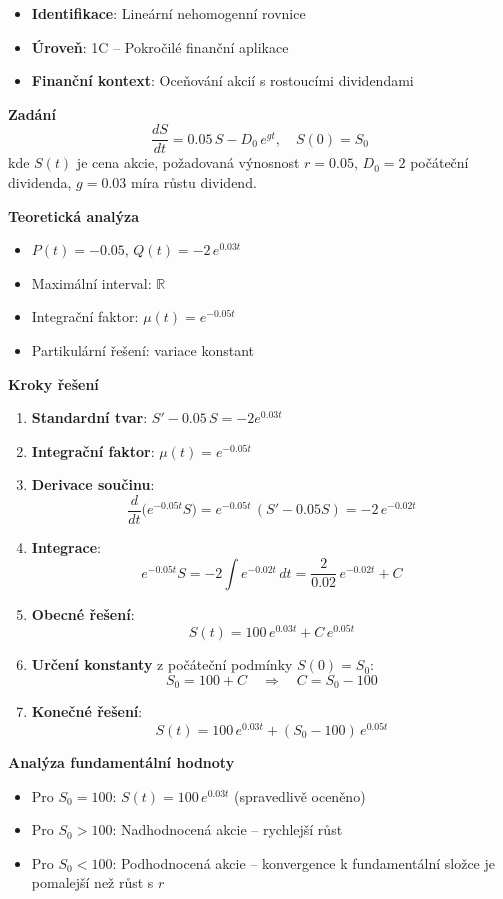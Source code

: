 \begin{example}
\label{ex:gordon-growth}

\begin{itemize}
\item \textbf{Identifikace}: Lineární nehomogenní rovnice
\item \textbf{Úroveň}: 1C -- Pokročilé finanční aplikace
\item \textbf{Finanční kontext}: Oceňování akcií s rostoucími dividendami
\end{itemize}

\noindent\textbf{Zadání}
\[
\frac{dS}{dt} = 0.05\,S - D_0\, e^{g t}, \quad S(0) = S_0
\]
kde $S(t)$ je cena akcie, požadovaná výnosnost $r=0.05$, $D_0 = 2$ počáteční dividenda, $g = 0.03$ míra růstu dividend.

\noindent\textbf{Teoretická analýza}
\begin{itemize}
\item $P(t) = -0.05$, $Q(t) = -2\,e^{0.03t}$
\item Maximální interval: $\mathbb{R}$
\item Integrační faktor: $\mu(t) = e^{-0.05t}$
\item Partikulární řešení: variace konstant
\end{itemize}

\noindent\textbf{Kroky řešení}
\begin{enumerate}
\item \textbf{Standardní tvar}: $S' - 0.05\,S = -2 e^{0.03t}$
\item \textbf{Integrační faktor}: $\mu(t) = e^{-0.05t}$
\item \textbf{Derivace součinu}:
\[
\frac{d}{dt}\!\bigl(e^{-0.05t} S\bigr) = e^{-0.05t}\,(S' - 0.05 S) = -2\, e^{-0.02 t}
\]
\item \textbf{Integrace}:
\[
e^{-0.05t} S = -2 \int e^{-0.02 t}\, dt = \frac{2}{0.02}\, e^{-0.02 t} + C
\]
\item \textbf{Obecné řešení}:
\[
S(t) = 100\, e^{0.03 t} + C\, e^{0.05 t}
\]
\item \textbf{Určení konstanty} z počáteční podmínky $S(0) = S_0$:
\[
S_0 = 100 + C \quad\Rightarrow\quad C = S_0 - 100
\]
\item \textbf{Konečné řešení}:
\[
S(t) = 100\, e^{0.03 t} + (S_0 - 100)\, e^{0.05 t}
\]
\end{enumerate}

\noindent\textbf{Analýza fundamentální hodnoty}
\begin{itemize}
\item Pro $S_0 = 100$: $S(t) = 100\, e^{0.03t}$ (spravedlivě oceněno)
\item Pro $S_0 > 100$: Nadhodnocená akcie -- rychlejší růst
\item Pro $S_0 < 100$: Podhodnocená akcie -- konvergence k fundamentální složce je pomalejší než růst s $r$
\end{itemize}


\end{example}
